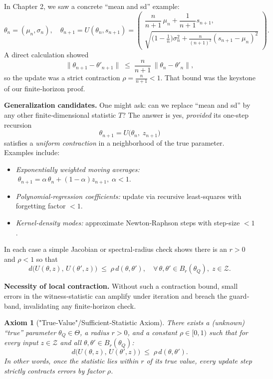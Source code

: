 \documentclass[12pt]{article}
\theoremstyle{definition}
\theoremstyle{plain}
\newtheorem{axiom}{Axiom}[section]
\begin{document}
In Chapter 2, we saw a concrete “mean and sd” example:
\[
  \theta_n = (\mu_n,\sigma_n),
  \quad
  \theta_{n+1}
    = U(\theta_n,s_{n+1})
    = \begin{pmatrix}
        \dfrac{n}{n+1}\,\mu_n + \dfrac{1}{n+1}s_{n+1},\\[1ex]
        \textstyle\sqrt{\bigl(1-\tfrac1n\bigr)\sigma_n^2 + \tfrac{n}{(n+1)^2}(s_{n+1}-\mu_n)^2}
      \end{pmatrix}.
\]
A direct calculation showed
\[
  \|\theta_{n+1}-\theta'_{n+1}\|
  \;\le\;
  \frac{n}{n+1}\,\|\theta_n-\theta'_n\|,
\]
so the update was a strict contraction \(\rho=\tfrac{n}{n+1}<1\).  That bound was the keystone of our finite‐horizon proof.

\medskip\noindent
\textbf{Generalization candidates.}
One might ask: can we replace “mean and sd” by any other finite‐dimensional statistic \(T\)?  The answer is yes, \textit{provided} its one‐step recursion
\[
  \theta_{n+1}
    = U\bigl(\theta_n,\;z_{n+1}\bigr)
\]
satisfies a \textit{uniform contraction} in a neighborhood of the true parameter.  Examples include:
\begin{itemize}[nosep]
  \item \emph{Exponentially weighted moving averages:}
    \(\;\theta_{n+1}=\alpha\,\theta_n+(1-\alpha)z_{n+1},\;\alpha<1.\)
  \item \emph{Polynomial‐regression coefficients:} update via recursive least‑squares with forgetting factor \(<1\).  
  \item \emph{Kernel‐density modes:} approximate Newton‐Raphson steps with step‐size \(<1\).
\end{itemize}
In each case a simple Jacobian or spectral‐radius check shows there is an \(r>0\) and \(\rho<1\) so that
\[
  d\bigl(U(\theta,z),\,U(\theta',z)\bigr)
  \;\le\;\rho\,d(\theta,\theta'),
  \quad
  \forall\,\theta,\theta'\in B_r(\theta_Q),\;z\in\mathcal Z.
\]

\medskip\noindent
\textbf{Necessity of local contraction.}
Without such a contraction bound, small errors in the witness‐statistic can amplify under iteration and breach the guard‐band, invalidating any finite‐horizon check.

\medskip\noindent
\begin{axiom}["True‐Value"/Sufficient‐Statistic Axiom]
\label{ax:sufficient_statistic}
There exists a (unknown) “true” parameter \(\theta_Q\in\Theta\), a radius \(r>0\), and a constant \(\rho\in[0,1)\) such that for every input \(z\in\mathcal Z\) and all \(\theta,\theta'\in B_r(\theta_Q)\):
\[
  d\bigl(U(\theta,z),\,U(\theta',z)\bigr)
  \;\le\;\rho\,d(\theta,\theta').
\]
In other words, once the statistic lies within \(r\) of its true value, every update step strictly contracts errors by factor \(\rho\).
\end{axiom}
\end{document}
